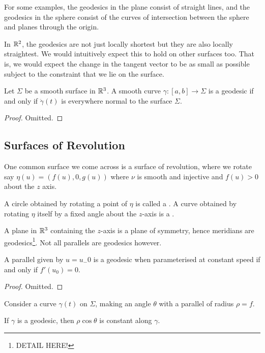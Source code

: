 \documentclass[a4paper, 10pt, twocolumn]{amsart}
\begin{document}
For some examples, the geodesics in the plane consist of straight lines, and the geodesics in the sphere consist of the curves of intersection between the sphere and planes through the origin.

In $\mathbb{R}^2$, the geodesics are not just locally shortest but they are also locally straightest. We would intuitively expect this to hold on other surfaces too. That is, we would expect the change in the tangent vector to be as small as possible subject to the constraint that we lie on the surface.

\begin{theorem}
    Let $\Sigma$ be a smooth surface in $\mathbb{R}^3$. A smooth curve $\gamma:[a, b] \rightarrow \Sigma$ is a geodesic if and only if $\ddot{\gamma}(t)$ is everywhere normal to the surface $\Sigma$.
\end{theorem}
\begin{proof}
    Omitted.
\end{proof}

\subsection{Surfaces of Revolution}

One common surface we come across is a surface of revolution, where we rotate say $\eta(u) = (f(u), 0, g(u))$ where $\nu$ is smooth and injective and $f(u)> 0$ about the $z$ axis.

\begin{definition}
A circle obtained by rotating a point of $\eta$ is called a . A curve obtained by rotating $\eta$ itself by a fixed angle about the $z$-axis is a .
\end{definition}

A plane in $\mathbb{R}^3$ containing the $z$-axis is a plane of symmetry, hence meridians are geodesics\footnote{\color{red} DETAIL HERE!}. Not all parallels are geodesics however.

\begin{lemma}
    A parallel given by $u = u_-0$ is a geodesic when parameterised at constant speed if and only if $f'(u_0) = 0$.
\end{lemma}
\begin{proof}
    Omitted.
\end{proof}

Consider a curve $\gamma(t)$ on $\Sigma$, making an angle $\theta$ with a parallel of radius $\rho = f$.

\begin{theorem}
    If $\gamma$ is a geodesic, then $\rho \cos \theta$ is constant along $\gamma$.
\end{theorem}
\end{document}
